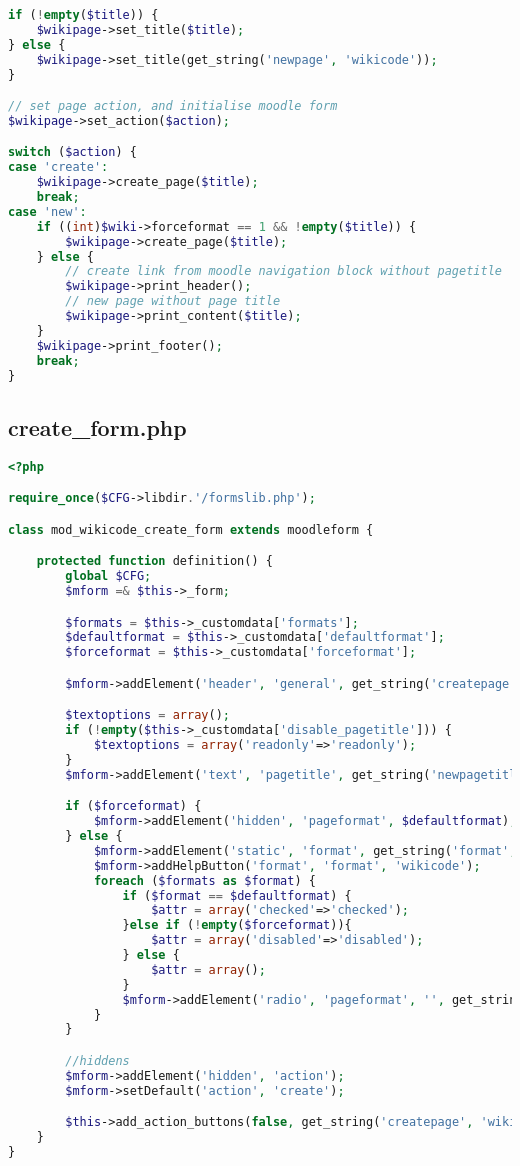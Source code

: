 \begin{lstlisting}[language=PHP]
if (!empty($title)) {
    $wikipage->set_title($title);
} else {
    $wikipage->set_title(get_string('newpage', 'wikicode'));
}

// set page action, and initialise moodle form
$wikipage->set_action($action);

switch ($action) {
case 'create':
    $wikipage->create_page($title);
    break;
case 'new':
    if ((int)$wiki->forceformat == 1 && !empty($title)) {
        $wikipage->create_page($title);
    } else {
        // create link from moodle navigation block without pagetitle
        $wikipage->print_header();
        // new page without page title
        $wikipage->print_content($title);
    }
    $wikipage->print_footer();
    break;
}
\end{lstlisting}

\subsection{create\_form.php}
\begin{lstlisting}[language=PHP]
<?php

require_once($CFG->libdir.'/formslib.php');

class mod_wikicode_create_form extends moodleform {

    protected function definition() {
        global $CFG;
        $mform =& $this->_form;

        $formats = $this->_customdata['formats'];
        $defaultformat = $this->_customdata['defaultformat'];
        $forceformat = $this->_customdata['forceformat'];

        $mform->addElement('header', 'general', get_string('createpage', 'wikicode'));

        $textoptions = array();
        if (!empty($this->_customdata['disable_pagetitle'])) {
            $textoptions = array('readonly'=>'readonly');
        }
        $mform->addElement('text', 'pagetitle', get_string('newpagetitle', 'wikicode'), $textoptions);

        if ($forceformat) {
            $mform->addElement('hidden', 'pageformat', $defaultformat);
        } else {
            $mform->addElement('static', 'format', get_string('format', 'wikicode'));
            $mform->addHelpButton('format', 'format', 'wikicode');
            foreach ($formats as $format) {
                if ($format == $defaultformat) {
                    $attr = array('checked'=>'checked');
                }else if (!empty($forceformat)){
                    $attr = array('disabled'=>'disabled');
                } else {
                    $attr = array();
                }
                $mform->addElement('radio', 'pageformat', '', get_string('format'.$format, 'wikicode'), $format, $attr);
            }
        }

        //hiddens
        $mform->addElement('hidden', 'action');
        $mform->setDefault('action', 'create');

        $this->add_action_buttons(false, get_string('createpage', 'wikicode'));
    }
}
\end{lstlisting}

